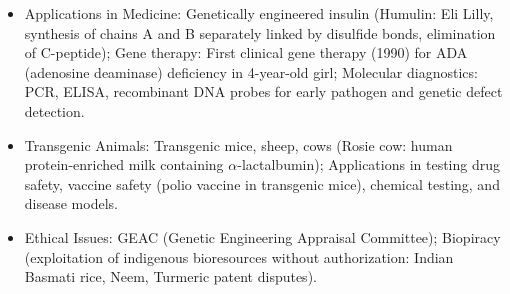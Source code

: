 \documentclass[11pt,a4paper]{article}
\begin{document}
\begin{itemize}
\begin{itemize}
    \item Applications in Medicine: Genetically engineered insulin (Humulin: Eli Lilly, synthesis of chains A and B separately linked by disulfide bonds, elimination of C-peptide); Gene therapy: First clinical gene therapy (1990) for ADA (adenosine deaminase) deficiency in 4-year-old girl; Molecular diagnostics: PCR, ELISA, recombinant DNA probes for early pathogen and genetic defect detection.
    \item Transgenic Animals: Transgenic mice, sheep, cows (Rosie cow: human protein-enriched milk containing $\alpha$-lactalbumin); Applications in testing drug safety, vaccine safety (polio vaccine in transgenic mice), chemical testing, and disease models.
    \item Ethical Issues: GEAC (Genetic Engineering Appraisal Committee); Biopiracy (exploitation of indigenous bioresources without authorization: Indian Basmati rice, Neem, Turmeric patent disputes).
  \end{itemize}
\end{itemize}
\end{document}
